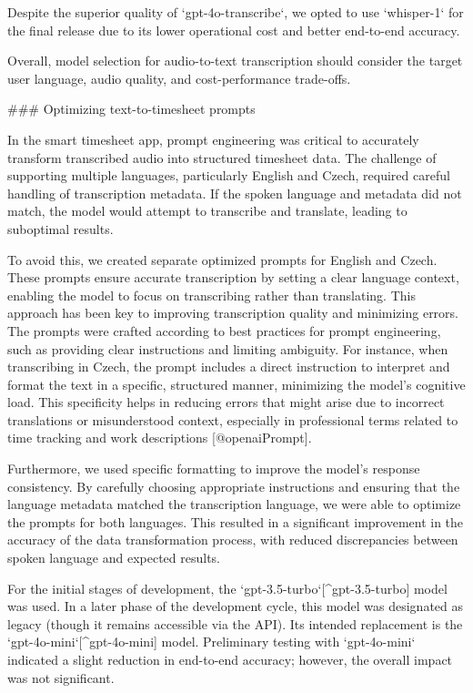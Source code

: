 \documentclass[
  digital,     %
  oneside,     %
  nosansbold,  %
  nocolorbold, %
  lof,         %
  lot,         %
]{fithesis4}
\begin{document}
\shorthandoff{-}
\begin{markdown}

Despite the superior quality of `gpt-4o-transcribe`, we opted to use `whisper-1` for the final release due to its lower operational cost and better end-to-end accuracy.

Overall, model selection for audio-to-text transcription should consider the target user language, audio quality, and cost-performance trade-offs.

### Optimizing text-to-timesheet prompts

In the smart timesheet app, prompt engineering was critical to accurately transform transcribed audio into structured timesheet data. The challenge of supporting multiple languages, particularly English and Czech, required careful handling of transcription metadata. If the spoken language and metadata did not match, the model would attempt to transcribe and translate, leading to suboptimal results.

To avoid this, we created separate optimized prompts for English and Czech. These prompts ensure accurate transcription by setting a clear language context, enabling the model to focus on transcribing rather than translating. This approach has been key to improving transcription quality and minimizing errors. The prompts were crafted according to best practices for prompt engineering, such as providing clear instructions and limiting ambiguity. For instance, when transcribing in Czech, the prompt includes a direct instruction to interpret and format the text in a specific, structured manner, minimizing the model’s cognitive load. This specificity helps in reducing errors that might arise due to incorrect translations or misunderstood context, especially in professional terms related to time tracking and work descriptions [@openaiPrompt].

Furthermore, we used specific formatting to improve the model’s response consistency. By carefully choosing appropriate instructions and ensuring that the language metadata matched the transcription language, we were able to optimize the prompts for both languages. This resulted in a significant improvement in the accuracy of the data transformation process, with reduced discrepancies between spoken language and expected results.

For the initial stages of development, the `gpt-3.5-turbo`[^gpt-3.5-turbo] model was used. In a later phase of the development cycle, this model was designated as legacy (though it remains accessible via the API). Its intended replacement is the `gpt-4o-mini`[^gpt-4o-mini] model. Preliminary testing with `gpt-4o-mini` indicated a slight reduction in end-to-end accuracy; however, the overall impact was not significant.


\end{markdown}
\end{document}
